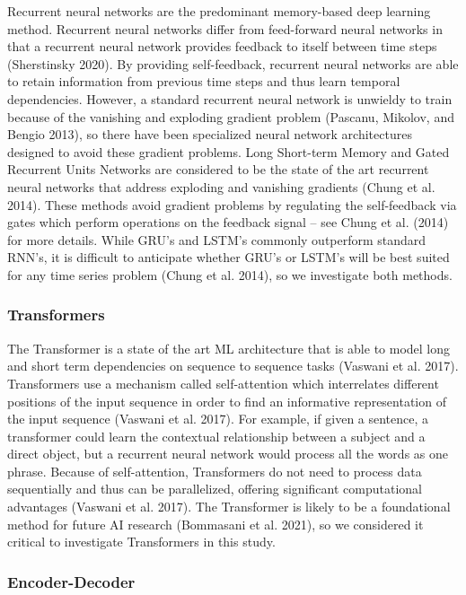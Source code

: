 \documentclass{article}
\begin{document}
Recurrent neural networks are the predominant memory-based deep learning
method. Recurrent neural networks differ from feed-forward neural
networks in that a recurrent neural network provides feedback to itself
between time steps (Sherstinsky 2020). By providing self-feedback,
recurrent neural networks are able to retain information from previous
time steps and thus learn temporal dependencies. However, a standard
recurrent neural network is unwieldy to train because of the vanishing
and exploding gradient problem (Pascanu, Mikolov, and Bengio 2013), so
there have been specialized neural network architectures designed to
avoid these gradient problems. Long Short-term Memory and Gated
Recurrent Units Networks are considered to be the state of the art
recurrent neural networks that address exploding and vanishing gradients
(Chung et al. 2014). These methods avoid gradient problems by regulating
the self-feedback via gates which perform operations on the feedback
signal -- see Chung et al. (2014) for more details. While GRU's and
LSTM's commonly outperform standard RNN's, it is difficult to anticipate
whether GRU's or LSTM's will be best suited for any time series problem
(Chung et al. 2014), so we investigate both methods.

\hypertarget{transformers}{%
\subsubsection{Transformers}\label{transformers}}

The Transformer is a state of the art ML architecture that is able to
model long and short term dependencies on sequence to sequence tasks
(Vaswani et al. 2017). Transformers use a mechanism called
self-attention which interrelates different positions of the input
sequence in order to find an informative representation of the input
sequence (Vaswani et al. 2017). For example, if given a sentence, a
transformer could learn the contextual relationship between a subject
and a direct object, but a recurrent neural network would process all
the words as one phrase. Because of self-attention, Transformers do not
need to process data sequentially and thus can be parallelized, offering
significant computational advantages (Vaswani et al. 2017). The
Transformer is likely to be a foundational method for future AI research
(Bommasani et al. 2021), so we considered it critical to investigate
Transformers in this study.

\hypertarget{encoder-decoder}{%
\subsubsection{Encoder-Decoder}\label{encoder-decoder}}
\end{document}
